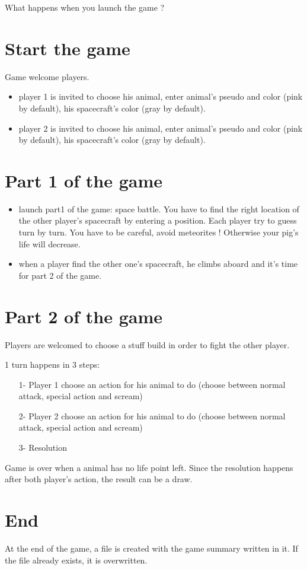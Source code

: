 What happens when you launch the game ?

\section{Start the game}
Game welcome players.

\begin{itemize}
 \item player 1 is invited to choose his animal, enter animal's pseudo and color (pink by default), his spacecraft's color (gray by default).
 \item player 2 is invited to choose his animal, enter animal's pseudo and color (pink by default), his spacecraft's color (gray by default).
\end{itemize}


\section{Part 1 of the game}

\begin{itemize}
 \item launch part1 of the game: space battle. You have to find the right location of the other player's spacecraft by entering a position. Each player try to guess turn by turn. You have to be careful, avoid meteorites ! Otherwise your pig's life will decrease.
 \item when a player find the other one's spacecraft, he climbs aboard and it's time for part 2 of the game.
\end{itemize}


\section{Part 2 of the game}

Players are welcomed to choose a stuff build in order to fight the other player.

1 turn happens in 3 steps:

\begin{itemize}
 \item[1-] Player 1 choose an action for his animal to do (choose between normal attack, special action and scream)
 \item[2-] Player 2 choose an action for his animal to do (choose between normal attack, special action and scream)
 \item[3-] Resolution
\end{itemize}

Game is over when a animal has no life point left. Since the resolution happens after both player's action, the result can be a draw.

\section{End}

At the end of the game, a file is created with the game summary written in it.
If the file already exists, it is overwritten.


